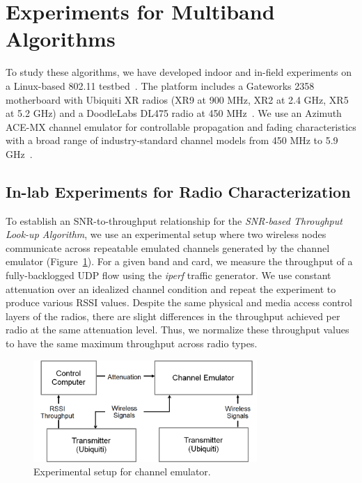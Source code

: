 \section{Experiments for Multiband Algorithms}
\label{sec:vncexperimentdesign}

To study these algorithms, we have developed indoor 
and in-field experiments on 
a Linux-based 802.11 testbed~\cite{Openwrt}. The platform includes a 
Gateworks 2358 motherboard with Ubiquiti XR radios (XR9 at 900 MHz, 
XR2 at 2.4 GHz, XR5 at 5.2 GHz) and a DoodleLabs DL475 radio at 
450 MHz~\cite{Gateworks,Ubnt}.  We use 
an Azimuth ACE-MX channel emulator for
controllable propagation and fading characteristics with a broad range of 
industry-standard channel models from 450 MHz to 5.9 GHz~\cite{AzimuthACE}. 

\subsection{In-lab Experiments for Radio Characterization}
\label{subsec:ichannel}
To establish an SNR-to-throughput relationship for the \emph{SNR-based 
Throughput Look-up Algorithm}, we use an experimental setup where two 
wireless nodes communicate across repeatable emulated channels generated 
by the channel emulator (Figure~\ref{fig:in-door experiment}). For a given band and card, we measure
the throughput of a fully-backlogged UDP flow using the {\it iperf} 
traffic generator. We use constant attenuation over an idealized
channel condition and repeat the experiment to
produce various RSSI values.
Despite the same physical and media access control layers of the radios, there are
slight differences in the throughput achieved per radio at the same attenuation
level.  Thus, we normalize these throughput values to have the same maximum
throughput across radio types.

\begin{figure} [h]
\centering
\includegraphics[width=85mm]{figures/emulator2}
\caption{Experimental setup for channel emulator.}
\label{fig:in-door experiment}
\vspace{-0.1in}
\end{figure}

